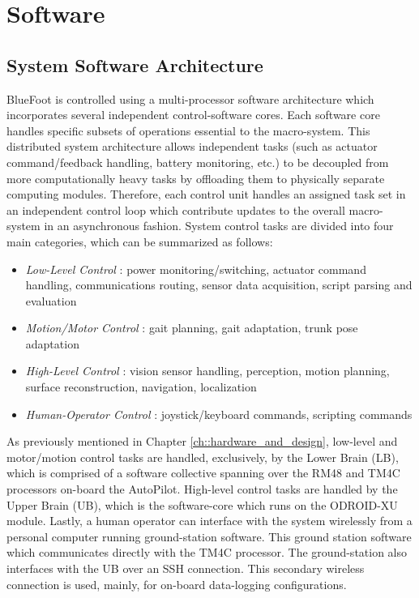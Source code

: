 \label{ch::software}
\chapter{Software}
	
	\section{System Software Architecture}
	
	BlueFoot is controlled using a multi-processor software architecture which incorporates several independent control-software cores. Each software core handles specific subsets of operations essential to the macro-system. This distributed system architecture allows independent tasks (such as actuator command/feedback handling, battery monitoring, etc.) to be decoupled from more computationally heavy tasks by offloading them to physically separate computing modules. Therefore, each control unit handles an assigned task set in an independent control loop which contribute updates to the overall macro-system in an asynchronous fashion. System control tasks are divided into four main categories, which can be summarized as follows:
		\begin{itemize}
			\item{
			\emph{Low-Level Control} : 
				power monitoring/switching, 
				actuator command handling, 
				communications routing,
				sensor data acquisition,
				script parsing and evaluation
			}
			\item{
			\emph{Motion/Motor Control} : 
				gait planning, 
				gait adaptation, 
				trunk pose adaptation
			}
			\item{
			\emph{High-Level Control} : 
				vision sensor handling,
				perception, 
				motion planning, 
				surface reconstruction, 
				navigation, 
				localization
			}
			\item{
			\emph{Human-Operator Control} : 
				joystick/keyboard commands,
				scripting commands
			}
		\end{itemize}
	As previously mentioned in Chapter \ref{ch::hardware_and_design}, low-level and motor/motion control tasks are handled, exclusively, by the Lower Brain (LB), which is comprised of a software collective spanning over the RM48 and TM4C processors on-board the AutoPilot. High-level control tasks are handled by the Upper Brain (UB), which is the software-core which runs on the ODROID-XU module. Lastly, a human operator can interface with the system wirelessly from a personal computer running ground-station software. This ground station software which communicates directly with the TM4C processor. The ground-station also interfaces with the UB over an SSH connection. This secondary wireless connection is used, mainly, for on-board data-logging configurations.

